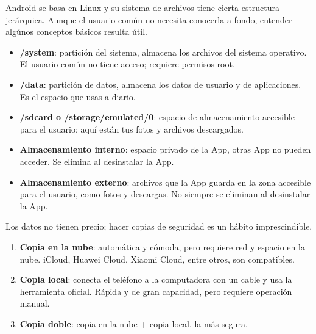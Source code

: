 
Android se basa en Linux y su sistema de archivos tiene cierta estructura jerárquica. Aunque el usuario común no necesita conocerla a fondo, entender algúnos conceptos básicos resulta útil.


\begin{itemize}
  \item \textbf{/system}: partición del sistema, almacena los archivos del sistema operativo. El usuario común no tiene acceso; requiere permisos root.
  \item \textbf{/data}: partición de datos, almacena los datos de usuario y de aplicaciones. Es el espacio que usas a diario.
  \item \textbf{/sdcard o /storage/emulated/0}: espacio de almacenamiento accesible para el usuario; aquí están tus fotos y archivos descargados.
\end{itemize}


\begin{itemize}
  \item \textbf{Almacenamiento interno}: espacio privado de la App, otras App no pueden acceder. Se elimina al desinstalar la App.
  \item \textbf{Almacenamiento externo}: archivos que la App guarda en la zona accesible para el usuario, como fotos y descargas. No siempre se eliminan al desinstalar la App.
\end{itemize}


Los datos no tienen precio; hacer copias de seguridad es un hábito imprescindible.


\begin{enumerate}
  \item \textbf{Copia en la nube}: automática y cómoda, pero requiere red y espacio en la nube. iCloud, Huawei Cloud, Xiaomi Cloud, entre otros, son compatibles.
  \item \textbf{Copia local}: conecta el teléfono a la computadora con un cable y usa la herramienta oficial. Rápida y de gran capacidad, pero requiere operación manual.
  \item \textbf{Copia doble}: copia en la nube + copia local, la más segura.
\end{enumerate}

